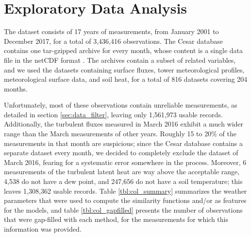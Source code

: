 \documentclass[a4paper]{book}
\begin{document}
\section{Exploratory Data Analysis}
\label{sec:eda}
The dataset consists of 17 years of measurements, from January 2001 to December 2017, for a total of 3,436,416 observations. The Cesar database contains one tar-gzipped archive for every month, whose content is a single data file in the netCDF format \citep{netcdf}. The archives contain a subset of related variables, and we used the datasets containing surface fluxes, tower meteorological profiles, meteorological surface  data, and soil heat, for a total of 816 datasets covering 204 months.

Unfortunately, most of these observations contain unreliable measurements, as detailed in section \ref{sec:data_filter}, leaving only  1,561,973 usable records. Additionally, the turbulent fluxes measured in March 2016 exhibit a much wider range than the March measurements of other years. Roughly 15 to 20\% of the measurements in that month are suspicious; since the Cesar database contains a separate dataset every month, we decided to completely exclude the dataset of March 2016, fearing for a systematic error somewhere in the process. Moreover, 6 measurements of the turbulent latent heat are way above the acceptable range, 4,538 do not have a dew point, and 247,656 do not have a soil temperature; this leaves 1,308,362 usable records. Table \ref{tbl:col_summary} summarizes the weather parameters that were used to compute the similarity functions and/or as features for the models, and table \ref{tbl:col_gapfilled} presents the number of observations that were gap-filled with each method, for the measurements for which this information was provided.
\end{document}
